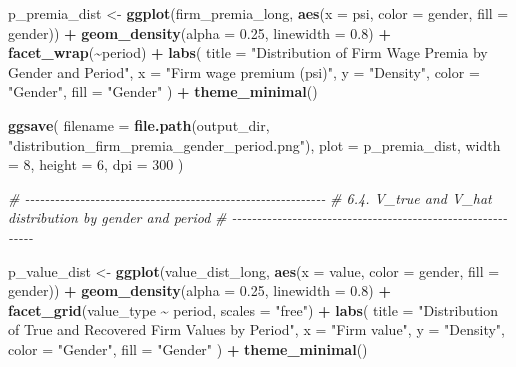 \documentclass[
]{article}
\newenvironment{Shaded}{\begin{snugshade}}{\end{snugshade}}
\newcommand{\AttributeTok}[1]{\textcolor[rgb]{0.13,0.29,0.53}{#1}}
\newcommand{\CommentTok}[1]{\textcolor[rgb]{0.56,0.35,0.01}{\textit{#1}}}
\newcommand{\DecValTok}[1]{\textcolor[rgb]{0.00,0.00,0.81}{#1}}
\newcommand{\FloatTok}[1]{\textcolor[rgb]{0.00,0.00,0.81}{#1}}
\newcommand{\FunctionTok}[1]{\textcolor[rgb]{0.13,0.29,0.53}{\textbf{#1}}}
\newcommand{\NormalTok}[1]{#1}
\newcommand{\OtherTok}[1]{\textcolor[rgb]{0.56,0.35,0.01}{#1}}
\newcommand{\SpecialCharTok}[1]{\textcolor[rgb]{0.81,0.36,0.00}{\textbf{#1}}}
\newcommand{\StringTok}[1]{\textcolor[rgb]{0.31,0.60,0.02}{#1}}
\begin{document}
\begin{Shaded}
\begin{Highlighting}[]
\NormalTok{p\_premia\_dist }\OtherTok{\textless{}{-}} \FunctionTok{ggplot}\NormalTok{(firm\_premia\_long, }\FunctionTok{aes}\NormalTok{(}\AttributeTok{x =}\NormalTok{ psi, }\AttributeTok{color =}\NormalTok{ gender, }\AttributeTok{fill =}\NormalTok{ gender)) }\SpecialCharTok{+}
    \FunctionTok{geom\_density}\NormalTok{(}\AttributeTok{alpha =} \FloatTok{0.25}\NormalTok{, }\AttributeTok{linewidth =} \FloatTok{0.8}\NormalTok{) }\SpecialCharTok{+}
    \FunctionTok{facet\_wrap}\NormalTok{(}\SpecialCharTok{\textasciitilde{}}\NormalTok{period) }\SpecialCharTok{+}
    \FunctionTok{labs}\NormalTok{(}
        \AttributeTok{title =} \StringTok{"Distribution of Firm Wage Premia by Gender and Period"}\NormalTok{,}
        \AttributeTok{x =} \StringTok{"Firm wage premium (psi)"}\NormalTok{,}
        \AttributeTok{y =} \StringTok{"Density"}\NormalTok{,}
        \AttributeTok{color =} \StringTok{"Gender"}\NormalTok{,}
        \AttributeTok{fill =} \StringTok{"Gender"}
\NormalTok{    ) }\SpecialCharTok{+}
    \FunctionTok{theme\_minimal}\NormalTok{()}

\FunctionTok{ggsave}\NormalTok{(}
    \AttributeTok{filename =} \FunctionTok{file.path}\NormalTok{(output\_dir, }\StringTok{"distribution\_firm\_premia\_gender\_period.png"}\NormalTok{),}
    \AttributeTok{plot =}\NormalTok{ p\_premia\_dist,}
    \AttributeTok{width =} \DecValTok{8}\NormalTok{,}
    \AttributeTok{height =} \DecValTok{6}\NormalTok{,}
    \AttributeTok{dpi =} \DecValTok{300}
\NormalTok{)}

\CommentTok{\# {-}{-}{-}{-}{-}{-}{-}{-}{-}{-}{-}{-}{-}{-}{-}{-}{-}{-}{-}{-}{-}{-}{-}{-}{-}{-}{-}{-}{-}{-}{-}{-}{-}{-}{-}{-}{-}{-}{-}{-}{-}{-}{-}{-}{-}{-}{-}{-}{-}{-}{-}{-}{-}{-}{-}{-}{-}{-}{-}{-}}
\CommentTok{\# 6.4. V\_true and V\_hat distribution by gender and period}
\CommentTok{\# {-}{-}{-}{-}{-}{-}{-}{-}{-}{-}{-}{-}{-}{-}{-}{-}{-}{-}{-}{-}{-}{-}{-}{-}{-}{-}{-}{-}{-}{-}{-}{-}{-}{-}{-}{-}{-}{-}{-}{-}{-}{-}{-}{-}{-}{-}{-}{-}{-}{-}{-}{-}{-}{-}{-}{-}{-}{-}{-}{-}}

\NormalTok{p\_value\_dist }\OtherTok{\textless{}{-}} \FunctionTok{ggplot}\NormalTok{(value\_dist\_long, }\FunctionTok{aes}\NormalTok{(}\AttributeTok{x =}\NormalTok{ value, }\AttributeTok{color =}\NormalTok{ gender, }\AttributeTok{fill =}\NormalTok{ gender)) }\SpecialCharTok{+}
    \FunctionTok{geom\_density}\NormalTok{(}\AttributeTok{alpha =} \FloatTok{0.25}\NormalTok{, }\AttributeTok{linewidth =} \FloatTok{0.8}\NormalTok{) }\SpecialCharTok{+}
    \FunctionTok{facet\_grid}\NormalTok{(value\_type }\SpecialCharTok{\textasciitilde{}}\NormalTok{ period, }\AttributeTok{scales =} \StringTok{"free"}\NormalTok{) }\SpecialCharTok{+}
    \FunctionTok{labs}\NormalTok{(}
        \AttributeTok{title =} \StringTok{"Distribution of True and Recovered Firm Values by Period"}\NormalTok{,}
        \AttributeTok{x =} \StringTok{"Firm value"}\NormalTok{,}
        \AttributeTok{y =} \StringTok{"Density"}\NormalTok{,}
        \AttributeTok{color =} \StringTok{"Gender"}\NormalTok{,}
        \AttributeTok{fill =} \StringTok{"Gender"}
\NormalTok{    ) }\SpecialCharTok{+}
    \FunctionTok{theme\_minimal}\NormalTok{()}


\end{Highlighting}
\end{Shaded}
\end{document}
